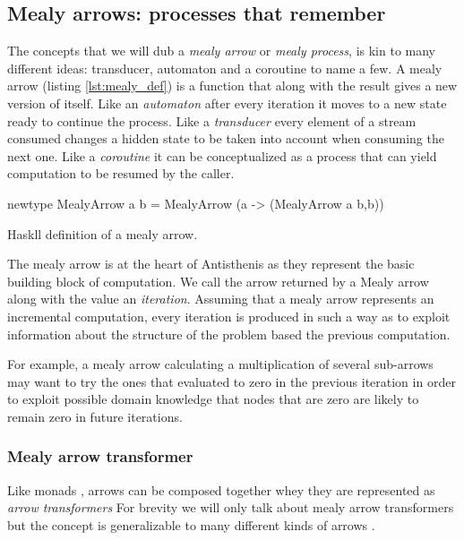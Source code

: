 \subsection{Mealy arrows:  processes that remember}
\label{sec:mealy_arrows}

The concepts that we will dub a \emph{mealy arrow} or \emph{mealy process}, is
kin to many different ideas: transducer, automaton and a coroutine to
name a few. A mealy arrow (listing \ref{lst:mealy_def}) is a function that
along with the result gives a new version of itself. Like an
\emph{automaton} after every iteration it moves to a new state ready to
continue the process. Like a \emph{transducer} every element of a stream
consumed changes a hidden state to be taken into account when
consuming the next one. Like a \emph{coroutine} it can be conceptualized as
a process that can yield computation to be resumed by the caller.

\begin{code}
\begin{haskellcode}
newtype MealyArrow a b =
  MealyArrow (a -> (MealyArrow a b,b))
\end{haskellcode}
  \caption{\label{lst:mealy_def}Haskll definition of a mealy arrow.}
\end{code}

The mealy arrow is at the heart of Antisthenis as they represent the
basic building block of computation. We call the arrow returned by a
Mealy arrow along with the value an \emph{iteration}. Assuming that a
mealy arrow represents an incremental computation, every iteration is
produced in such a way as to exploit information about the structure
of the problem based the previous computation.

For example, a mealy arrow calculating a multiplication of several
sub-arrows may want to try the ones that evaluated to zero in the
previous iteration in order to exploit possible domain knowledge that
nodes that are zero are likely to remain zero in future iterations.

\subsubsection{Mealy arrow transformer}

Like monads \cite{liangMonadTransformersModular1995} , arrows can be
composed together whey they are represented as \emph{arrow transformers}
For brevity we will only talk about mealy arrow transformers but the
concept is generalizable to many different kinds of arrows
\cite{keidelSoundReusableComponents2019a}.

